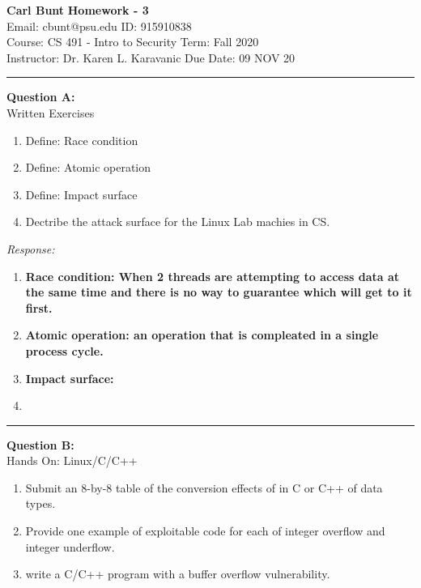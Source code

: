 \documentclass[a4paper, 11pt]{article}
\newenvironment{problem}[2][Question]
               { \begin{mdframed}[backgroundcolor=gray!20] \textbf{#1 #2:} \\}
               {   \end{mdframed}}
\newenvironment{response}
                {\textit{Response:}}
                {}
\begin{document}
 \noindent
 \large\textbf{Carl Bunt} \hfill \textbf{Homework - 3}   \\
 Email: cbunt@psu.edu \hfill ID: 915910838 \\
 \normalsize Course: CS 491 - Intro to Security \hfill Term: Fall 2020\\
 Instructor: Dr. Karen L. Karavanic \hfill Due Date: 09 NOV 20\\
 \noindent\rule{7in}{2.8pt}

 \begin{problem}{A}
   Written Exercises \\
   \begin{enumerate}[label=\arabic*.]
   \item
     Define: Race condition     
   \item
     Define: Atomic operation
   \item
     Define: Impact surface
   \item
     Dectribe the attack surface for the Linux Lab machies in CS.
   \end{enumerate}
 \end{problem}

 \begin{response}
   \begin{enumerate}[label=\arabic*.]
   \item
     \bf{Race condition}: When 2 threads are attempting to access data at the same time and there is no way to guarantee which will get to it first.
   \item
     \bf{Atomic operation}: an operation that is compleated in a single process cycle.
   \item
     \bf{Impact surface}: 
   \item
     
   \end{enumerate}      
 \end{response}
 \noindent\rule{7in}{2.8pt}

 \begin{problem}{B} 
   Hands On: Linux/C/C++\\

   \begin{enumerate}[label=\arabic*.]
   \item
     Submit an 8-by-8 table of the conversion effects of in C or C++ of data types.
   \item
     Provide one example of exploitable code for each of integer overflow and integer underflow. 
   \item
     write a C/C++ program with a buffer overflow vulnerability.
      
  \end{enumerate}
\end{problem}
\end{document}
